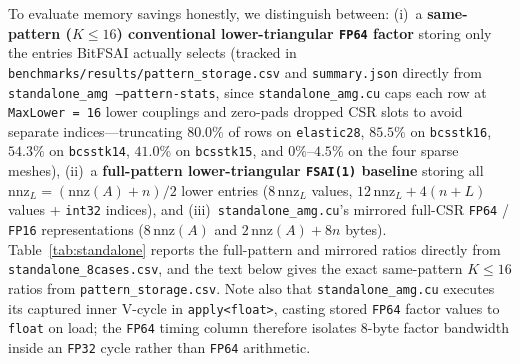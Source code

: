 \documentclass[10pt]{article}
\begin{document}
To evaluate memory savings honestly, we distinguish between: (i)~a \textbf{same-pattern ($K \le 16$) conventional lower-triangular \texttt{FP64} factor} storing only the entries BitFSAI actually selects (tracked in \texttt{benchmarks/results/pattern\_storage.csv} and \texttt{summary.json} directly from \texttt{standalone\_amg --pattern-stats}, since \texttt{standalone\_amg.cu} caps each row at \texttt{MaxLower = 16} lower couplings and zero-pads dropped CSR slots to avoid separate indices---truncating $80.0\%$ of rows on \texttt{elastic28}, $85.5\%$ on \texttt{bcsstk16}, $54.3\%$ on \texttt{bcsstk14}, $41.0\%$ on \texttt{bcsstk15}, and $0\%$--$4.5\%$ on the four sparse meshes), (ii)~a \textbf{full-pattern lower-triangular \texttt{FSAI(1)} baseline} storing all $\mathrm{nnz}_L = (\mathrm{nnz}(A) + n)/2$ lower entries ($8\,\mathrm{nnz}_L$ values, $12\,\mathrm{nnz}_L + 4(n + L)$ values + \texttt{int32} indices), and (iii)~\texttt{standalone\_amg.cu}'s mirrored full-CSR \texttt{FP64} / \texttt{FP16} representations ($8\,\mathrm{nnz}(A)$ and $2\,\mathrm{nnz}(A) + 8n$ bytes). Table~\ref{tab:standalone} reports the full-pattern and mirrored ratios directly from \texttt{standalone\_8cases.csv}, and the text below gives the exact same-pattern $K \le 16$ ratios from \texttt{pattern\_storage.csv}. Note also that \texttt{standalone\_amg.cu} executes its captured inner V-cycle in \texttt{apply<float>}, casting stored \texttt{FP64} factor values to \texttt{float} on load; the \texttt{FP64} timing column therefore isolates 8-byte factor bandwidth inside an \texttt{FP32} cycle rather than \texttt{FP64} arithmetic.
\end{document}
